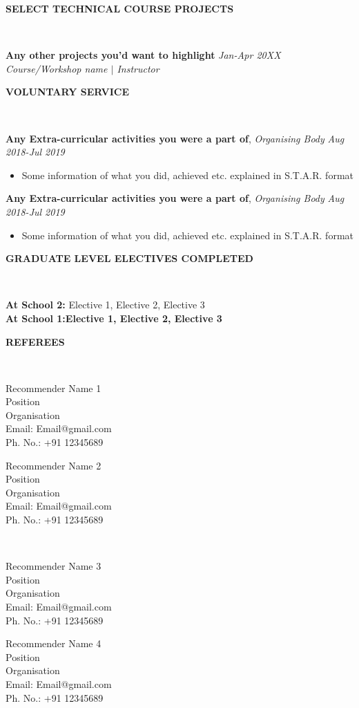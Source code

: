 \documentclass[9pt]{article}
\newenvironment{changemargin}[2]{%
  \begin{list}{}{%
    \setlength{\topsep}{0pt}%
    \setlength{\leftmargin}{#1}%
    \setlength{\rightmargin}{#2}%
    \setlength{\listparindent}{\parindent}%
    \setlength{\itemindent}{\parindent}%
    \setlength{\parsep}{\parskip}%
  }%
  \item[]}{\end{list}
}
\newcommand{\lineover}{
	\begin{changemargin}{-0.05in}{-0.05in}
		\vspace*{-8pt}
		\hrulefill \\
		\vspace*{-2pt}
	\end{changemargin}
}
\newcommand{\header}[1]{
	\begin{changemargin}{-0.7in}{-0.35in}
		\begin{large}
		\scshape{\textbf{#1}}\\
		\end{large}
  	\lineover
	\end{changemargin}
}
\newcommand{\jobdescription}[1]{
	\begin{changemargin}{0.05in}{0.05in}
    \smallskip
		{#1}
    \medskip
	\end{changemargin}
}
\newcommand{\jobtitle}[3]{
	\textbf{#1} \hfill \emph{#3}\\
	\emph{#2}
}
\newcommand{\recommenderLeft}[5]{
\begin{minipage}{0.45\textwidth}
\Large{#1}\\
\normalsize #2\\
#3\\
Email: #4\\
Ph. No.: #5
\end{minipage}
}
\newcommand{\recommenderRight}[5]{
\begin{minipage}{4in}
\Large{#1}\\
\normalsize #2\\
#3\\
Email: #4\\
Ph. No.: #5
\end{minipage}
}
\newcommand{\PORtitle}[3]{
	\textbf{#1}, \emph{#2} \hfill \emph{#3}\\

}
\newenvironment{body} {
	\vspace*{-16pt}
	\begin{changemargin}{-0.65in}{-0.5in}
  }	
	{\end{changemargin}
}
\begin{document}

\medskip%

\header{SELECT TECHNICAL COURSE PROJECTS}

\begin{body}
	\vspace{14pt}
	\jobtitle{Any other projects you'd want to highlight}{Course/Workshop name $|$ Instructor}{Jan-Apr 20XX}
  
\end{body}

\medskip

\header{VOLUNTARY SERVICE}

\begin{body}
	\vspace{14pt}
	\PORtitle{Any Extra-curricular activities you were a part of}{Organising Body}{Aug 2018-Jul 2019}
	 \vspace{-3pt}
	  \jobdescription{
    \begin{itemize} \itemsep -6pt  %

      \item Some information of what you did, achieved etc. explained in S.T.A.R. format 
    \end{itemize}}
    \vspace{-3pt}
	\PORtitle{Any Extra-curricular activities you were a part of}{Organising Body}{Aug 2018-Jul 2019}
	 \vspace{-3pt}
	  \jobdescription{
    \begin{itemize} \itemsep -6pt  %

      \item Some information of what you did, achieved etc. explained in S.T.A.R. format 
    \end{itemize}}
    \vspace{-3pt}

\end{body}

\medskip
\header{GRADUATE LEVEL ELECTIVES COMPLETED}
\begin{body}
	\vspace{14pt}
\textbf{At School 2:} Elective 1, Elective 2, Elective 3\\
\vspace{5pt}
\textbf{At School 1:Elective 1, Elective 2, Elective 3}

\end{body}
\medskip
\header{REFEREES}

\vspace{25pt}
\begin{body}
\recommenderLeft{Recommender  Name 1}{Position}{Organisation}{Email@gmail.com}{+91 12345689} \hfill \recommenderRight{Recommender  Name 2}{Position}{Organisation}{Email@gmail.com}{+91 12345689}
\\ \vspace{7pt}
\recommenderLeft{Recommender  Name 3}{Position}{Organisation}{Email@gmail.com}{+91 12345689} \hfill \recommenderRight{Recommender  Name 4}{Position}{Organisation}{Email@gmail.com}{+91 12345689}
\end{body}
\end{document}
